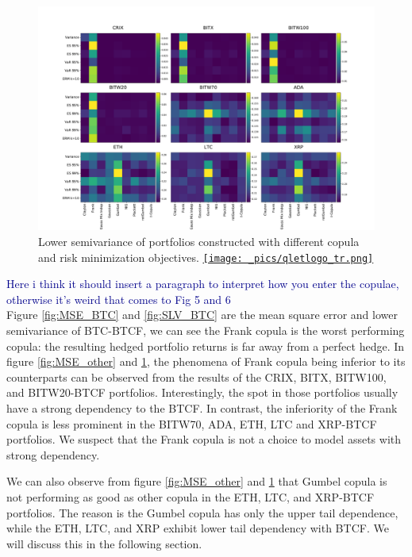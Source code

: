 \begin{figure}[th]
    \centering
    \includegraphics[width=\textwidth]{_pics/semiLowerVariance_other.pdf}
  \caption{Lower semivariance of portfolios constructed with different copula and risk minimization objectives.
  \href{http://www.quantlet.com/}{\texttt{[image: \_pics/qletlogo\_tr.png]}} }
\label{fig:SLV_other}
\end{figure}
\textcolor{darkblue}{Here i think it should insert a paragraph to interpret how you enter the copulae, otherwise it's weird that comes to Fig 5 and 6}\\

Figure \ref{fig:MSE_BTC} and \ref{fig:SLV_BTC} are the mean square error and lower semivariance of BTC-BTCF, we can see the Frank copula is the worst performing copula:
the resulting hedged portfolio returns is far away from a perfect hedge.
In figure \ref{fig:MSE_other} and \ref{fig:SLV_other}, the phenomena of Frank copula being inferior to its counterparts can be observed from the results of the CRIX, BITX, BITW100, and BITW20-BTCF portfolios.
Interestingly, the spot in those portfolios usually have a strong dependency to the BTCF.
In contrast, the inferiority of the Frank copula is less prominent in the BITW70, ADA, ETH, LTC and XRP-BTCF portfolios.
We suspect that the Frank copula is not a choice to model assets with strong dependency.  \medskip

We can also observe from figure \ref{fig:MSE_other} and \ref{fig:SLV_other} that Gumbel copula is not performing as good as other copula in the ETH, LTC, and XRP-BTCF portfolios.
The reason is the Gumbel copula has only the upper tail dependence, while the ETH, LTC, and XRP exhibit lower tail dependency with BTCF.
We will discuss this in the following section. \medskip

